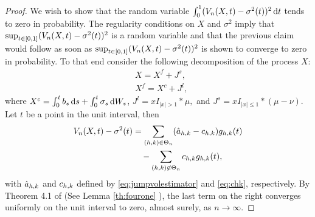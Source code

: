 \begin{proof}
  We wish to show that the random variable
  $\int_0^1 (\jvn - \sigma^2(t))^2\D t$ tends to zero in probability. The regularity conditions on $X$ and $\sigma^2$ imply that  $\sup_{t \in [0,1]} (\jvn - \sigma^2(t))^2$ is a random variable and that the previous claim would follow as soon as $\sup_{t \in [0,1]} (\jvn - \sigma^2(t))^2$ is shown  to converge to  zero in probability.  To that end consider the following decomposition of the process $X$:
  \begin{align}
    &X = X^f + J^s\label{eq:xj},\\
    &X^f = X^c + J^l\label{eq:xjc},
  \end{align}
  where 
    $X^c = \int^t_0 b_s \D s + \int^t_0 \sigma_s \D W_s$, 
    $J^l = xI_{\vert x \vert > 1} \ast \mu,$
    and $J^s = xI_{\vert x \vert \le  1} \ast (\mu - \nu)$.
    Let $t$ be a point in the unit interval, then 
    \begin{align}
      \jvn -  \sigma^2(t) &= \sumt (\ceen{X} - \cee) \ghk(t)\notag \\
& \quad - \sumnt \cee \ghk(t),
      \label{eq:open}
    \end{align}
    with $\ceen{X}$ and $\cee$ defined by \eqref{eq:jumpvolestimator} and \eqref{eq:chk}, respectively. 
    By Theorem 4.1 of \cite{Zhang2008} (See Lemma \ref{th:fourone} ), the last term on the right converges uniformly  on the unit  interval  to zero, almost surely, as $n \to \infty$. 
    

\end{proof}
